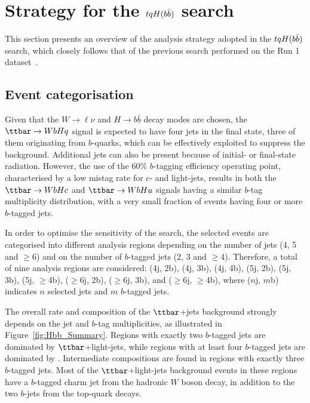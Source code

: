 
\section{Strategy for the $tqH(b\bar{b})$ search}
\label{sec:strategy_Hbb}

This section presents an overview of the analysis strategy adopted in the $tqH(b\bar{b})$ search, which
closely follows that of the previous search performed on the Run 1 dataset~\cite{Aad:2015pja}.

\subsection{Event categorisation}
\label{sec:event_categorisation}

Given that the $W\to\ell\nu$ and $H\to b\bar{b}$ decay modes are chosen, the $\ttbar \to WbHq$ signal 
is expected to have four jets in the final state, three of them originating from $b$-quarks, which 
can be effectively exploited to suppress the background. 
Additional jets can also be present because of initial- or final-state radiation.
However, the use of the 60\% $b$-tagging efficiency operating point, characterised by a low mistag rate for
$c$- and light-jets, results in both the $\Hc$ and $\Hu$ signals having a similar $b$-tag multiplicity distribution,
with a very small fraction of events having four or more $b$-tagged jets.

In order to optimise the sensitivity of the search, the selected events are categorised into different analysis 
regions depending on the number of jets (4, 5 and $\geq$6) and on the number of $b$-tagged jets (2, 3 and $\geq$4).
Therefore, a total of nine analysis regions are considered:
(4j, 2b), (4j, 3b), (4j, 4b), (5j, 2b), (5j, 3b), (5j, $\geq$4b), ($\geq$6j, 2b), ($\geq$6j, 3b), and ($\geq$6j, $\geq$4b), 
where ($n$j, $m$b) indicates $n$ selected jets and $m$ $b$-tagged jets. 

The overall rate and composition of the $\ttbar$+jets background strongly depends on the jet and $b$-tag 
multiplicities, as illustrated in Figure~\ref{fig:Hbb_Summary}.
Regions with exactly two $b$-tagged jets are dominated by $\ttbar$+light-jets, while regions with 
at least four $b$-tagged jets are dominated by \ttbin. Intermediate compositions are found in regions with exactly three 
$b$-tagged jets.  Most of the $\ttbar$+light-jets background events in these regions have a $b$-tagged charm jet from the hadronic $W$ boson 
decay, in addition to the two $b$-jets from the top-quark decays.


